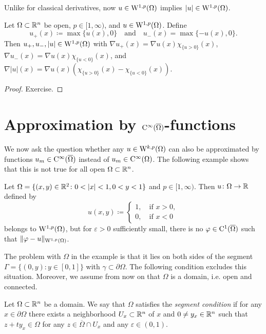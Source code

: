 Unlike for classical derivatives, now $u \in \mathrm{W}^{1,p}(\Omega)$ implies $|u| \in \mathrm{W}^{1,p}(\Omega)$.

\begin{cor}
  Let $\Omega \subset \mathbb{R}^n$ be open, $p \in [1,\infty)$, and $u \in \mathrm{W}^{1,p}(\Omega)$.
  Define 
  $$u_+(x) \coloneqq \max\{u(x),0\} \quad\text{and}\quad u_-(x) = \max\{-u(x),0\}.$$
  Then $u_+, u_-,|u| \in \mathrm{W}^{1,p}(\Omega)$ with
    $\nabla u_+(x) = \nabla u(x) \chi_{\{ u > 0\}}(x)$, $\nabla u_-(x) = \nabla u(x) \chi_{\{ u < 0\}}(x)$, and $\nabla|u|(x) = \nabla u(x) \left( \chi_{\{ u > 0\} } (x) - \chi_{\{u < 0\}} (x) \right)$.
\end{cor}

\begin{proof}
  Exercise.
\end{proof}

\section{Approximation by \texorpdfstring{$\mathrm{C}^\infty(\overline{\Omega})$}{C\textasciicircum infty(Omega) }-functions}

We now ask the question whether any $u \in \mathrm{W}^{k,p}(\Omega)$ can also be approximated by functions $u_m \in \mathrm{C}^\infty(\overline\Omega)$ instead of $u_m \in \mathrm{C}^\infty(\Omega)$.
The following example shows that this is not true for all open $\Omega \subset \mathbb{R}^n$.

\begin{ex}
  Let $\Omega = \{(x,y) \in \mathbb{R}^2 \colon 0 < |x| < 1, 0 < y < 1\}$ and $p \in [1,\infty)$.
  Then $u \colon \Omega \to \mathbb{R}$ defined by
  $$
  u(x,y) \coloneqq \begin{cases} 1, \quad\text{if } x > 0,\\ 0, \quad\text{if } x < 0 \end{cases}
  $$
  belongs to $\mathrm{W}^{1,p}(\Omega)$, but for $\varepsilon > 0$ sufficiently small, there is no $\varphi \in \mathrm{C}^1(\overline\Omega)$ such that $\|\varphi - u\|_{\mathrm{W}^{1,p}(\Omega)}$.
\end{ex}

The problem with $\Omega$ in the example is that it lies on both sides of the segment $\Gamma = \{(0,y) \colon y \in [0,1]\}$ with $\gamma \subset \partial \Omega$.
The following condition excludes this situation.
Moreover, we assume from now on that $\Omega$ is a domain, i.e. open and connected.

\begin{defn}
  \label{defn:segmentCond}
  Let $\Omega \subset \mathbb{R}^n$ be a domain.
  We say that $\Omega$ satisfies the \emph{segment condition} if for any $x \in \partial\Omega$ there exists a neighborhood $U_x \subset \mathbb{R}^n$ of $x$ and $0 \neq y_x \in \mathbb{R}^n$ such that $z + t y_x \in \Omega$ for any $z \in \overline\Omega \cap U_x$ and any $\varepsilon \in (0,1)$.
\end{defn}

